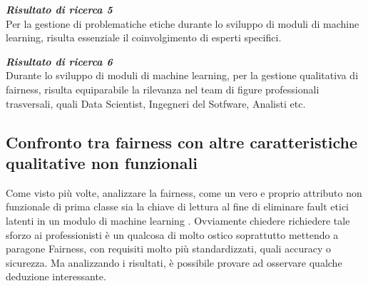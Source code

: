 	\begin{center}
	
        \begin{tcolorbox}[width=\textwidth, colframe=black, colback=Gray]
    			\begin{minipage}{\textwidth}
    				\textit{\faKey  \textbf{ Risultato di ricerca 5}}\\
    			 Per la gestione di problematiche etiche durante lo sviluppo di moduli di machine learning, risulta essenziale il coinvolgimento di esperti specifici.
    			\end{minipage}
		\end{tcolorbox}
	\end{center}
	

	
	\begin{center}
	
        \begin{tcolorbox}[width=\textwidth, colframe=black, colback=Gray]
    			\begin{minipage}{\textwidth}
    				\textit{\faKey  \textbf{ Risultato di ricerca 6}}\\
    			 Durante lo sviluppo di moduli di machine learning, per la gestione qualitativa di fairness, risulta equiparabile la rilevanza nel team di figure professionali trasversali, quali Data Scientist, Ingegneri del Sotfware, Analisti etc.
    			\end{minipage}
		\end{tcolorbox}
	\end{center}
    \subsection{Confronto tra fairness con altre caratteristiche qualitative non funzionali}
    
    \begin{center}
		\hspace*{-5mm}%
	\end{center}
	Come visto più volte, analizzare la fairness, come un vero e proprio attributo non funzionale di prima classe sia la chiave di lettura al fine di eliminare fault etici latenti in un modulo di machine learning \cite{brun2018software}. Ovviamente chiedere richiedere tale sforzo ai professionisti è un qualcosa di molto ostico soprattutto mettendo a paragone Fairness, con requisiti molto più standardizzati, quali accuracy o sicurezza. Ma analizzando i risultati, è possibile provare ad osservare qualche deduzione interessante.\\
	

